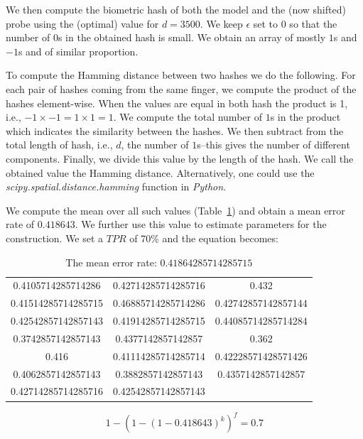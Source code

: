 We then compute the biometric hash of both the model and the (now shifted) probe using the (optimal) value for $d = 3500$. We keep $\epsilon$ set to $0$ so that the number of $0$s in the obtained hash is small. We obtain an array of mostly $1$s and $-1$s and of similar proportion.


To compute the Hamming distance between two hashes we do the following. For each pair of hashes coming from the same finger, we compute the product of the hashes element-wise. When the values are equal in both hash the product is 1, i.e., $-1\times-1 = 1\times 1 = 1$. We compute the total number of $1$s in the product which indicates the similarity between the hashes. We then subtract from the total length of hash, i.e., $d$, the number of $1$s--this gives the number of different components. Finally, we divide this value by the length of the hash. We call the obtained value the Hamming distance. Alternatively, one could use the \textit{scipy.spatial.distance.hamming} function in \textit{Python}.

We compute the mean over all such values (Table~\ref{tab:errrate}) and obtain a mean error rate of $0.418643$. We further use this value to estimate parameters for the construction. We set a $TPR$ of 70\% and the equation becomes:


\begin{table}[t]
\small
    \centering
    \begin{tabular}{c|c|c}
0.4105714285714286 & 0.42714285714285716 & 0.432\\
0.41514285714285715 &  0.46885714285714286 &  0.42742857142857144  \\ 
0.42542857142857143 & 0.41914285714285715 & 0.44085714285714284\\ 
0.3742857142857143 & 0.4377142857142857 & 0.362\\ 
0.416 & 0.41114285714285714 &  0.42228571428571426\\
0.4062857142857143 & 0.3882857142857143 & 0.4357142857142857 \\
0.42714285714285716 & 0.42542857142857143 &
    \end{tabular}
    \caption{The mean error rate: $0.41864285714285715$}
    \label{tab:errrate}
\end{table}








$$ 1- \left(1 - \left(1 - 0.418643 \right)^k\right)^f = 0.7$$



